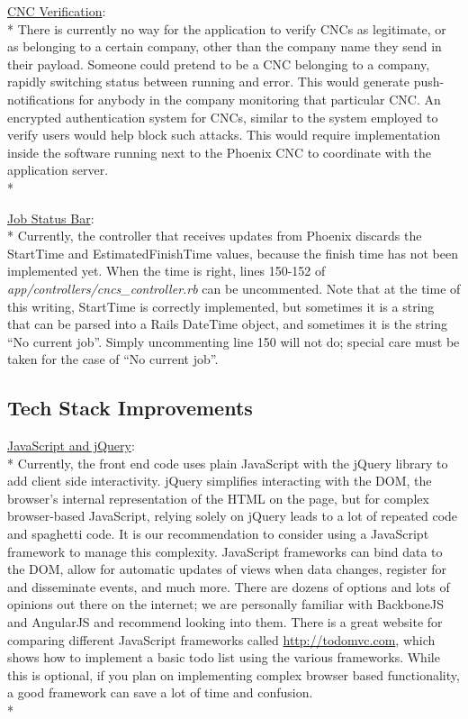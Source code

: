 \documentclass[12pt,letterpaper,titlepage]{article}
\begin{document}
\noindent\underline{CNC Verification}:\\*
There is currently no way for the application to verify CNCs as legitimate, or as belonging to a certain company, other than the company name they send in their payload. Someone could pretend to be a CNC belonging to a company, rapidly switching status between running and error. This would generate push-notifications for anybody in the company monitoring that particular CNC. An encrypted authentication system for CNCs, similar to the system employed to verify users would help block such attacks. This would require implementation inside the software running next to the Phoenix CNC to coordinate with the application server.\\*

\noindent\underline{Job Status Bar}:\\*
Currently, the controller that receives updates from Phoenix discards the StartTime and EstimatedFinishTime values, because the finish time has not been implemented yet. When the time is right, lines 150-152 of \textit{app/controllers/cncs\_controller.rb} can be uncommented. Note that at the time of this writing, StartTime is correctly implemented, but sometimes it is a string that can be parsed into a Rails DateTime object, and sometimes it is the string ``No current job''. Simply uncommenting line 150 will not do; special care must be taken for the case of ``No current job''.

\subsection{Tech Stack Improvements} \label{doc:TechStackImprovements}

\noindent\underline{JavaScript and jQuery}:\\*
Currently, the front end code uses plain JavaScript with the jQuery library to add client side interactivity. jQuery simplifies interacting with the DOM, the browser's internal representation of the HTML on the page, but for complex browser-based JavaScript, relying solely on jQuery leads to a lot of repeated code and spaghetti code. It is our recommendation to consider using a JavaScript framework to manage this complexity. JavaScript frameworks can bind data to the DOM, allow for automatic updates of views when data changes, register for and disseminate events, and much more. There are dozens of options and lots of opinions out there on the internet; we are personally familiar with BackboneJS and AngularJS and recommend looking into them. There is a great website for comparing different JavaScript frameworks called \url{http://todomvc.com}, which shows how to implement a basic todo list using the various frameworks. While this is optional, if you plan on implementing complex browser based functionality, a good framework can save a lot of time and confusion.\\*
\end{document}
